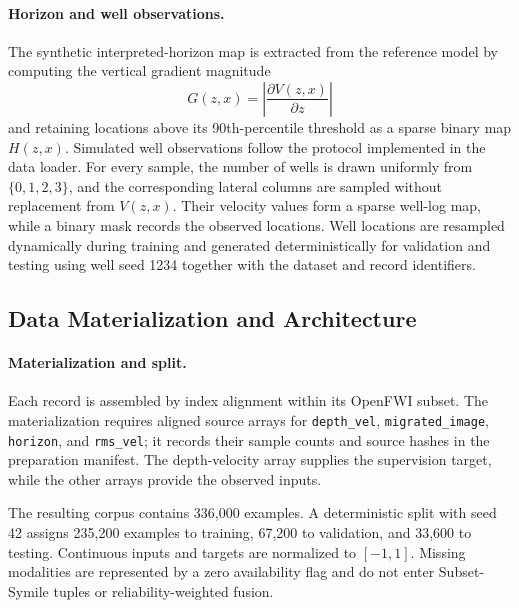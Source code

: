 \documentclass[letterpaper]{article}
\begin{document}
\paragraph{Horizon and well observations.}
The synthetic interpreted-horizon map is extracted from the reference model by computing the vertical gradient magnitude
\begin{equation}
G(z,x)=\left|\frac{\partial V(z,x)}{\partial z}\right|
\end{equation}
and retaining locations above its 90th-percentile threshold as a sparse binary map $H(z,x)$. Simulated well observations follow the protocol implemented in the data loader. For every sample, the number of wells is drawn uniformly from $\{0,1,2,3\}$, and the corresponding lateral columns are sampled without replacement from $V(z,x)$. Their velocity values form a sparse well-log map, while a binary mask records the observed locations. Well locations are resampled dynamically during training and generated deterministically for validation and testing using well seed 1234 together with the dataset and record identifiers.

\subsection{Data Materialization and Architecture}
\paragraph{Materialization and split.}
Each record is assembled by index alignment within its OpenFWI subset. The materialization requires aligned source arrays for \texttt{depth\_vel}, \texttt{migrated\_image}, \texttt{horizon}, and \texttt{rms\_vel}; it records their sample counts and source hashes in the preparation manifest. The depth-velocity array supplies the supervision target, while the other arrays provide the observed inputs.

The resulting corpus contains 336,000 examples. A deterministic split with seed 42 assigns 235,200 examples to training, 67,200 to validation, and 33,600 to testing. Continuous inputs and targets are normalized to $[-1,1]$. Missing modalities are represented by a zero availability flag and do not enter Subset-Symile tuples or reliability-weighted fusion.
\end{document}
